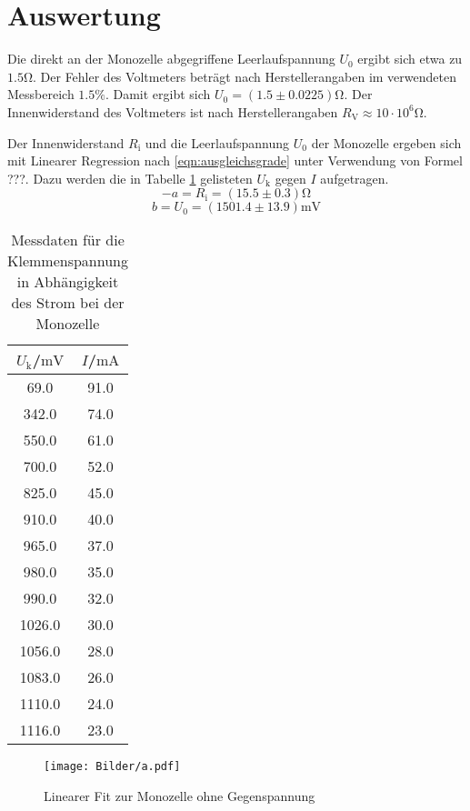 \section{Auswertung}
\label{sec:Auswertung}
Die direkt an der Monozelle abgegriffene Leerlaufspannung $U_\text{0}$ ergibt sich etwa zu $1.5 \si{\ohm}$.
Der Fehler des Voltmeters beträgt nach Herstellerangaben im verwendeten Messbereich $1.5\%$.
Damit ergibt sich $U_\text{0}=(1.5 \pm 0.0225) \si{\ohm}$.
Der Innenwiderstand des Voltmeters ist nach Herstellerangaben $R_\text{V}\approx 10 \cdot 10^6 \si{\ohm}$.

Der Innenwiderstand $R_\text{i}$ und die Leerlaufspannung $U_\text{0}$ der Monozelle ergeben sich mit Linearer Regression nach \eqref{eqn:ausgleichsgrade} unter Verwendung von Formel ???.
Dazu werden die in Tabelle \ref{tab:monozelle} gelisteten $U_\text{k}$ gegen $I$ aufgetragen.
\begin{equation*}
  -a= R_\text{i}=(15.5\pm0.3)\si{\ohm}
\end{equation*}
\begin{equation*}
  b =U_\text{0}=(1501.4\pm13.9)\si{\milli\volt}
\end{equation*}


\begin{table}
  \centering
  \label{tab:monozelle}
  \caption{Messdaten für die Klemmenspannung in Abhängigkeit des Strom bei der Monozelle}
\begin{tabular}{cc}
  \toprule
$U_\text{k}$/$\si{\milli\volt}$ & $I$/$\si{\milli\ampere}$\\
\midrule
69.0 & 91.0 \\
342.0 & 74.0 \\
550.0 & 61.0 \\
700.0 & 52.0 \\
825.0 & 45.0 \\
910.0 & 40.0 \\
965.0 & 37.0 \\
980.0 & 35.0 \\
990.0 & 32.0 \\
1026.0 & 30.0 \\
1056.0 & 28.0 \\
1083.0 & 26.0 \\
1110.0 & 24.0 \\
1116.0 & 23.0 \\
\bottomrule
\end{tabular}
\end{table}
\begin{figure}
\texttt{[image: Bilder/a.pdf]}
\caption{Linearer Fit zur Monozelle ohne Gegenspannung}
\label{fig:plot_a}
\end{figure}
